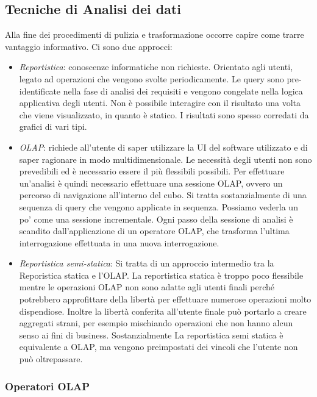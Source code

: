 \subsection{Tecniche di Analisi dei dati}
Alla fine dei procedimenti di pulizia e trasformazione occorre capire come trarre vantaggio informativo.
Ci sono due approcci:
\begin{itemize}
	\item \textit{Reportistica}: conoscenze informatiche non richieste. Orientato agli utenti, legato ad operazioni che vengono svolte periodicamente. Le query sono pre-identificate nella fase di analisi dei requisiti e vengono congelate nella logica applicativa degli utenti. Non è possibile interagire con il risultato una volta che viene visualizzato, in quanto è statico. I risultati sono spesso corredati da grafici di vari tipi.
	\item \textit{OLAP}: richiede all'utente di saper utilizzare la UI del software utilizzato e di saper ragionare in modo multidimensionale. Le necessità degli utenti non sono prevedibili ed è necessario essere il più flessibili possibili. Per effettuare un'analisi è quindi necessario effettuare una sessione OLAP, ovvero un percorso di navigazione all'interno del cubo. Si tratta sostanzialmente di una sequenza di query che vengono applicate in sequenza. Possiamo vederla un po' come una sessione incrementale. Ogni passo della sessione di analisi è scandito dall'applicazione di un operatore OLAP, che trasforma l'ultima interrogazione effettuata in una nuova interrogazione.
	\item \textit{Reportistica semi-statica}: Si tratta di un approccio intermedio tra la Reporistica statica e l'OLAP. La reportistica statica è troppo poco flessibile mentre le operazioni OLAP non sono adatte agli utenti finali perché potrebbero approfittare della libertà per effettuare numerose operazioni molto dispendiose. Inoltre la libertà conferita all'utente finale può portarlo a creare aggregati strani, per esempio mischiando operazioni che non hanno alcun senso ai fini di business. Sostanzialmente La reportistica semi statica è equivalente a OLAP, ma vengono preimpostati dei vincoli che l'utente non può oltrepassare.
\end{itemize}

\subsubsection{Operatori OLAP}

